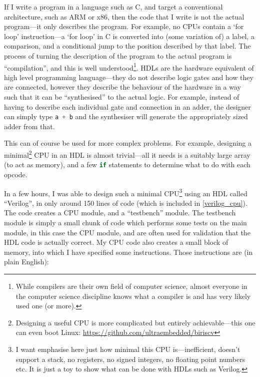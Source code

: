 \documentclass[12pt]{article}
\begin{document}
If I write a program in a language such as C, and target a conventional architecture, such as ARM or x86, then the code that I write is not the actual program---it only describes the program. For example, no CPUs contain a `for loop' instruction---a `for loop' in C is converted into (some variation of) a label, a comparison, and a conditional jump to the position described by that label. The process of turning the description of the program to the actual program is ``compilation'', and this is well understood\footnote{While compilers are their own field of computer science, almost everyone in the computer science discipline knows what a compiler is and has very likely used one (or more).}.
HDLs are the hardware equivalent of high level programming language---they do not describe logic gates and how they are connected, however they describe the behaviour of the hardware in a way such that it can be ``synthesised'' to the actual logic. For example, instead of having to describe each individual gate and connection in an adder, the designer can simply type \lstinline[language=Verilog]|a + b| and the synthesiser will generate the appropriately sized adder from that.

This can of course be used for more complex problems. For example, designing a minimal\footnote{Designing a useful CPU is more complicated but entirely achievable---this one can even boot Linux: \url{https://github.com/ultraembedded/biriscv}} CPU in an HDL is almost trivial---all it needs is a suitably large array (to act as memory), and a few \lstinline[language=Verilog]|if| statements to determine what to do with each opcode.

In a few hours, I was able to design such a minimal CPU\footnote{I want emphasise here just how minimal this CPU is---inefficient, doesn't support a stack, no registers, no signed integers, no floating point numbers etc. It is just a toy to show what can be done with HDLs such as Verilog.} using an HDL called ``Verilog'', in only around 150 lines of code (which is included in \ref{verilog_cpu}). The code creates a CPU module, and a ``testbench'' module. The testbench module is simply a small chunk of code which performs some tests on the main module, in this case the CPU module, and are often used for validation that the HDL code is actually correct. My CPU code also creates a small block of memory, into which I have specified some instructions. Those instructions are (in plain English):
\end{document}
